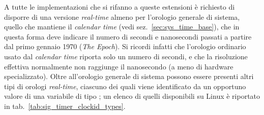A tutte le implementazioni che si rifanno a queste estensioni è richiesto di
disporre di una versione \textit{real-time} almeno per l'orologio generale di
sistema, quello che mantiene il \textit{calendar time} (vedi
sez.~\ref{sec:sys_time_base}), che in questa forma deve indicare il numero di
secondi e nanosecondi passati a partire dal primo gennaio 1970 (\textit{The
  Epoch}). Si ricordi infatti che l'orologio ordinario usato dal
\textit{calendar time} riporta solo un numero di secondi, e che la risoluzione
effettiva normalmente non raggiunge il nanosecondo (a meno di hardware
specializzato).  Oltre all'orologio generale di sistema possono essere
presenti altri tipi di orologi \textit{real-time}, ciascuno dei quali viene
identificato da un opportuno valore di una variabile di tipo
; un elenco di quelli disponibili su Linux è riportato in
tab.~\ref{tab:sig_timer_clockid_types}.

